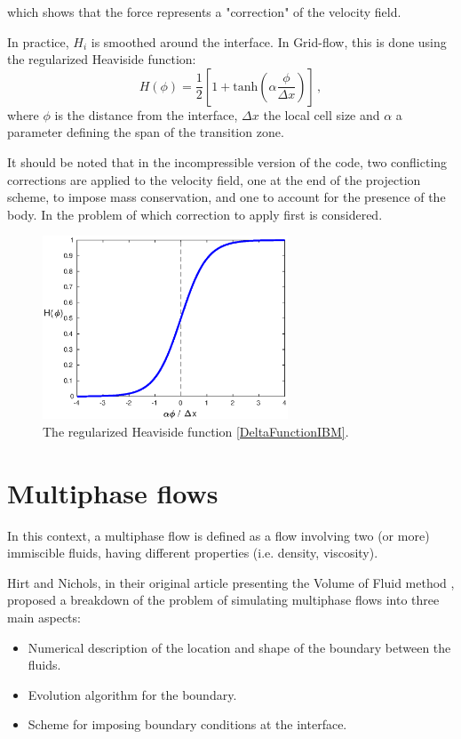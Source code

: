 \documentclass[11pt, a4paper, oneside, openany]{book}
\begin{document}
which shows that the force represents a "correction" of the velocity field.\par 
In practice, $H_{i}$ is smoothed around the interface. In Grid-flow, this is done using the regularized Heaviside function:
\begin{equation}
H\left(\phi\right)=\dfrac{1}{2}\left[1+\mathrm{tanh}\left(\alpha\dfrac{\phi}{\Delta x}\right)\right]\,,\label{DeltaFunctionIBM}
\end{equation}
where $\phi$ is the distance from the interface, $\Delta x$ the local cell size and $\alpha$ a parameter defining the span of the transition zone.\par
It should be noted that in the incompressible version of the code, two conflicting corrections are applied to the velocity field, one at the end of the projection scheme, to impose mass conservation, and one to account for the presence of the body. In \cite{Vittoz2018} the problem of which correction to apply first is considered.  
\begin{figure}[!ht]
	\centering
	\includegraphics[width=0.65\textwidth]{Heaviside.eps}
	\caption[Regularized Heaviside function]{The regularized Heaviside function \eqref{DeltaFunctionIBM}.}
	\label{Heaviside}
\end{figure}\noindent
\chapter{Multiphase flows}\label{Chapter_Multiphase_Flows}
In this context, a multiphase flow is defined as a flow involving two (or more) immiscible fluids, having different properties (i.e. density, viscosity).\par
Hirt and Nichols, in their original article presenting the Volume of Fluid method \cite{hirt1981volume}, proposed a breakdown of the problem of simulating multiphase flows into three main aspects:
\begin{itemize}
\item Numerical description of the location and shape of the boundary between the fluids.
\item Evolution algorithm for the boundary.
\item Scheme for imposing boundary conditions at the interface.
\end{itemize}
\end{document}
